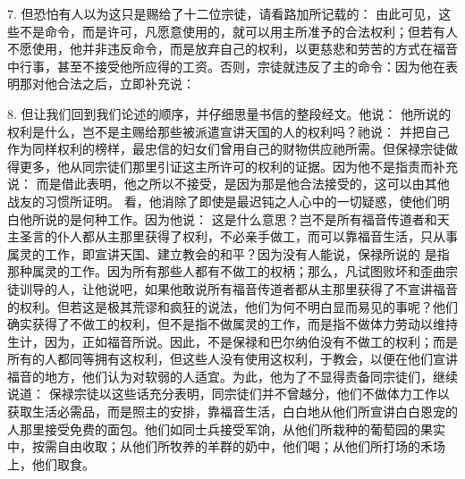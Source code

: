 7. 但恐怕有人以为这只是赐给了十二位宗徒，请看路加所记载的： 由此可见，这些不是命令，而是许可，凡愿意使用的，就可以用主所准予的合法权利；但若有人不愿使用，他并非违反命令，而是放弃自己的权利，以更慈悲和劳苦的方式在福音中行事，甚至不接受他所应得的工资。否则，宗徒就违反了主的命令：因为他在表明那对他合法之后，立即补充说：\par

8. 但让我们回到我们论述的顺序，并仔细思量书信的整段经文。他说： 他所说的权利是什么，岂不是主赐给那些被派遣宣讲天国的人的权利吗？祂说： 并把自己作为同样权利的榜样，最忠信的妇女们曾用自己的财物供应祂所需。但保禄宗徒做得更多，他从同宗徒们那里引证这主所许可的权利的证据。因为他不是指责而补充说： 而是借此表明，他之所以不接受，是因为那是他合法接受的，这可以由其他战友的习惯所证明。 看，他消除了即使是最迟钝之人心中的一切疑惑，使他们明白他所说的是何种工作。因为他说： 这是什么意思？岂不是所有福音传道者和天主圣言的仆人都从主那里获得了权利，不必亲手做工，而可以靠福音生活，只从事属灵的工作，即宣讲天国、建立教会的和平？因为没有人能说，保禄所说的 是指那种属灵的工作。因为所有那些人都有不做工的权柄；那么，凡试图败坏和歪曲宗徒训导的人，让他说吧，如果他敢说所有福音传道者都从主那里获得了不宣讲福音的权利。但若这是极其荒谬和疯狂的说法，他们为何不明白显而易见的事呢？他们确实获得了不做工的权利，但不是指不做属灵的工作，而是指不做体力劳动以维持生计，因为，正如福音所说。因此，不是保禄和巴尔纳伯没有不做工的权利；而是所有的人都同等拥有这权利，但这些人没有使用这权利，于教会，以便在他们宣讲福音的地方，他们认为对软弱的人适宜。为此，他为了不显得责备同宗徒们，继续说道： 保禄宗徒以这些话充分表明，同宗徒们并不曾越分，他们不做体力工作以获取生活必需品，而是照主的安排，靠福音生活，白白地从他们所宣讲白白恩宠的人那里接受免费的面包。他们如同士兵接受军饷，从他们所栽种的葡萄园的果实中，按需自由收取；从他们所牧养的羊群的奶中，他们喝；从他们所打场的禾场上，他们取食。\par

